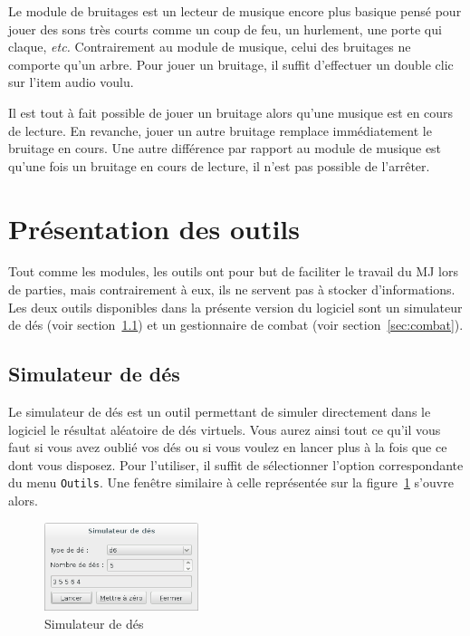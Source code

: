 \documentclass[a4paper,12pt]{article}
\newcommand*{\interfaceitem}[1]{\texttt{#1}}
\begin{document}
Le module de bruitages est un lecteur de musique encore plus basique pensé pour jouer des sons très courts comme un coup de feu, un hurlement, une porte qui claque, \emph{etc.}
Contrairement au module de musique, celui des bruitages ne comporte qu'un arbre.
Pour jouer un bruitage, il suffit d'effectuer un double clic sur l'item audio voulu.

Il est tout à fait possible de jouer un bruitage alors qu'une musique est en cours de lecture.
En revanche, jouer un autre bruitage remplace immédiatement le bruitage en cours.
Une autre différence par rapport au module de musique est qu'une fois un bruitage en cours de lecture, il n'est pas possible de l'arrêter.

\section{Présentation des outils}
\label{sec:outils}

Tout comme les modules, les outils ont pour but de faciliter le travail du MJ lors de parties, mais contrairement à eux, ils ne servent pas à stocker d'informations.
Les deux outils disponibles dans la présente version du logiciel sont un simulateur de dés (voir section~\ref{sec:des}) et un gestionnaire de combat (voir section~\ref{sec:combat}).

\subsection{Simulateur de dés}
\label{sec:des}

Le simulateur de dés est un outil permettant de simuler directement dans le logiciel le résultat aléatoire de dés virtuels.
Vous aurez ainsi tout ce qu'il vous faut si vous avez oublié vos dés ou si vous voulez en lancer plus à la fois que ce dont vous disposez.
Pour l'utiliser, il suffit de sélectionner l'option correspondante du menu \interfaceitem{Outils}.
Une fenêtre similaire à celle représentée sur la figure~\ref{simulateur_des} s'ouvre alors.
\begin{figure}[ht]
    \centerline{\includegraphics[width=0.4\textwidth]{simulateur_de_des}}
    \caption{Simulateur de dés}
    \label{simulateur_des}
\end{figure}
\end{document}
